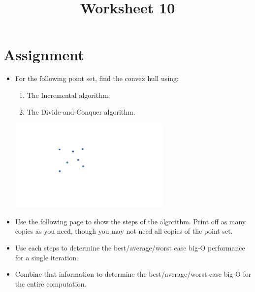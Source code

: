 \documentclass[a4paper,12pt]{article}
\title{Worksheet 10}
\begin{document}
\maketitle

\worksheetGroundRules


\vspace{5pt}
\section{Assignment}

\begin{itemize}


\item For the following point set, find the convex hull using:

\begin{enumerate}
	\item The Incremental algorithm. 
	\item The Divide-and-Conquer algorithm. 
\end{enumerate}

\vspace{-10pt}
\begin{center}
\includegraphics[width=8cm]{../images/chull.pdf}
\end{center}

\vspace{-10pt}
\item Use the following page to show the steps of the algorithm. Print off as many copies as you need, though you may not need all copies of the point set. 

\item Use each steps to determine the best/average/worst case big-O performance for a single iteration. 
\item Combine that information to determine the best/average/worst case big-O for the entire computation.



\end{itemize}


\worksheetSubmission
\end{document}
